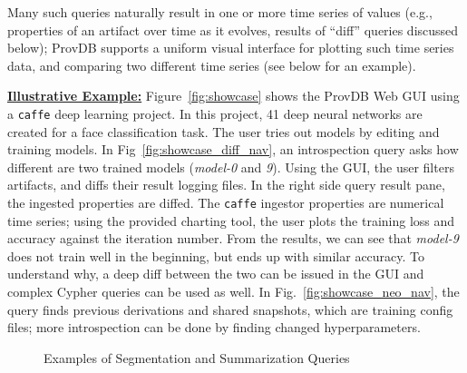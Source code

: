 \documentclass[11pt]{article}
\newcommand{\provdb}{{\sc ProvDB}\xspace}
\newcommand{\topic}[1]{\vspace{3pt}\noindent\underline{\bf #1}}
\begin{document}
Many such queries naturally result in one or more time series of values (e.g., properties of an artifact over time as it evolves, results of ``diff'' queries discussed below); \provdb supports a uniform visual interface for plotting such time series data, and comparing two different time series (see below for an example).


\topic{Illustrative Example:} Figure~\ref{fig:showcase} shows the \provdb Web GUI using a {\tt caffe} deep learning project. In this project, 41 deep neural networks are created for a face classification task. The user tries out models by editing and training models. In Fig~\ref{fig:showcase_diff_nav}, an introspection query asks how different are two trained models (\emph{model-0} and \emph{9}). Using the GUI, the user filters artifacts, and diffs their result logging files. In the right side query result pane, the ingested properties are diffed. The {\tt caffe} ingestor properties are numerical time series; using the provided charting tool, the user plots the training loss and accuracy against the iteration number. From the results, we can see that \emph{model-9} does not train well in the beginning, but ends up with similar accuracy. To understand why, a deep diff between the two can be issued in the GUI and complex Cypher queries can be used as well. In Fig.~\ref{fig:showcase_neo_nav}, the query finds previous derivations and shared snapshots, which are training config files; more introspection can be done by finding changed hyperparameters.


\begin{figure}[t!]
\vspace{-7pt}
\caption{Examples of Segmentation and Summarization Queries}
\vspace{-12pt}
\label{fig:example_queries}
\end{figure}
\end{document}
